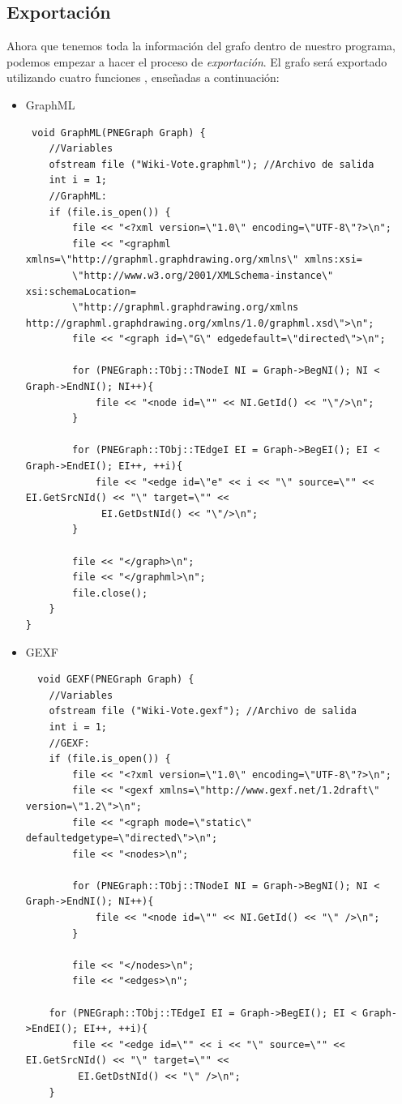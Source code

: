 \documentclass[acmlarge,screen]{acmart}
\begin{document}
\subsection{Exportación}
Ahora que tenemos toda la información del grafo dentro de nuestro programa, podemos empezar a hacer el proceso de {\it exportación}. El grafo será exportado utilizando cuatro funciones \cite{git}, enseñadas a continuación:
\begin{itemize}
\item GraphML \label{GraphML}
 \begin{verbatim}
 void GraphML(PNEGraph Graph) {
	//Variables
	ofstream file ("Wiki-Vote.graphml"); //Archivo de salida
	int i = 1;
	//GraphML:
	if (file.is_open()) {
		file << "<?xml version=\"1.0\" encoding=\"UTF-8\"?>\n";
		file << "<graphml xmlns=\"http://graphml.graphdrawing.org/xmlns\" xmlns:xsi=
		\"http://www.w3.org/2001/XMLSchema-instance\" xsi:schemaLocation=
		\"http://graphml.graphdrawing.org/xmlns http://graphml.graphdrawing.org/xmlns/1.0/graphml.xsd\">\n";
		file << "<graph id=\"G\" edgedefault=\"directed\">\n";

		for (PNEGraph::TObj::TNodeI NI = Graph->BegNI(); NI < Graph->EndNI(); NI++){
			file << "<node id=\"" << NI.GetId() << "\"/>\n";
		}

		for (PNEGraph::TObj::TEdgeI EI = Graph->BegEI(); EI < Graph->EndEI(); EI++, ++i){
			file << "<edge id=\"e" << i << "\" source=\"" << EI.GetSrcNId() << "\" target=\"" <<
			 EI.GetDstNId() << "\"/>\n";
		}

		file << "</graph>\n";
		file << "</graphml>\n";
		file.close();
	}
}
 \end{verbatim}
\item GEXF \label{GEXF}
 \begin{verbatim}
  void GEXF(PNEGraph Graph) {
	//Variables
	ofstream file ("Wiki-Vote.gexf"); //Archivo de salida
	int i = 1;
	//GEXF:
	if (file.is_open()) {
		file << "<?xml version=\"1.0\" encoding=\"UTF-8\"?>\n";
		file << "<gexf xmlns=\"http://www.gexf.net/1.2draft\" version=\"1.2\">\n";
		file << "<graph mode=\"static\" defaultedgetype=\"directed\">\n";
		file << "<nodes>\n";

		for (PNEGraph::TObj::TNodeI NI = Graph->BegNI(); NI < Graph->EndNI(); NI++){
			file << "<node id=\"" << NI.GetId() << "\" />\n";
		}

		file << "</nodes>\n";
		file << "<edges>\n";

	for (PNEGraph::TObj::TEdgeI EI = Graph->BegEI(); EI < Graph->EndEI(); EI++, ++i){
		file << "<edge id=\"" << i << "\" source=\"" << EI.GetSrcNId() << "\" target=\"" <<
		 EI.GetDstNId() << "\" />\n";
	}


\end{verbatim}
\end{itemize}
\end{document}
